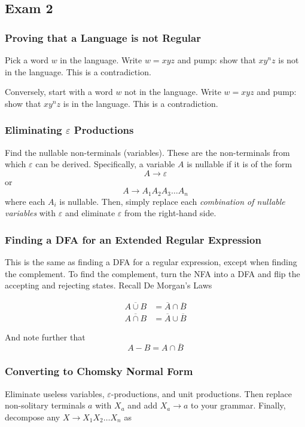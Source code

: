 \pagebreak\subsection{Exam 2}\label{subsec:exam-2-cheatsheet}
\subsubsection{Proving that a Language is not Regular}
Pick a word \(w\) in the language. Write \(w=xyz\) and pump: show that \(xy^nz\) is not in the language. This is a contradiction.

Conversely, start with a word \(w\) not in the language. Write \(w=xyz\) and pump: show that \(xy^nz\) is in the language. This is a contradiction.

\subsubsection{Eliminating \texorpdfstring{\(\varepsilon \)}{e} Productions}
Find the nullable non-terminals (variables). These are the non-terminals from which \(\varepsilon \) can be derived. Specifically, a variable \(A\) is nullable if it is of the form \[A\to\varepsilon \] or \[A\to A_1A_2A_3\hdots A_n\] where each \(A_i\) is nullable. Then, simply replace each \textit{combination of nullable variables} with \(\varepsilon \) and eliminate \(\varepsilon \) from the right-hand side. 

\subsubsection{Finding a DFA for an Extended Regular Expression}
This is the same as finding a DFA for a regular expression, except when finding the complement. To find the complement, turn the NFA into a DFA and flip the accepting and rejecting states. Recall De Morgan's Laws

\begin{align*}
    \overline{A\cup B} &= \overline{A} \cap \overline{B}\\
    \overline{A\cap B} &= \overline{A} \cup \overline{B}
\end{align*}

And note further that \[A-B=A\cap\overline{B} \]

\subsubsection{Converting to Chomsky Normal Form}
Eliminate useless variables, \(\varepsilon \)-productions, and unit productions. Then replace non-solitary terminals \(a\) with \(X_a\) and add \(X_a\to a\) to your grammar. Finally, decompose any \(X\to X_1X_2\hdots X_n\) as

